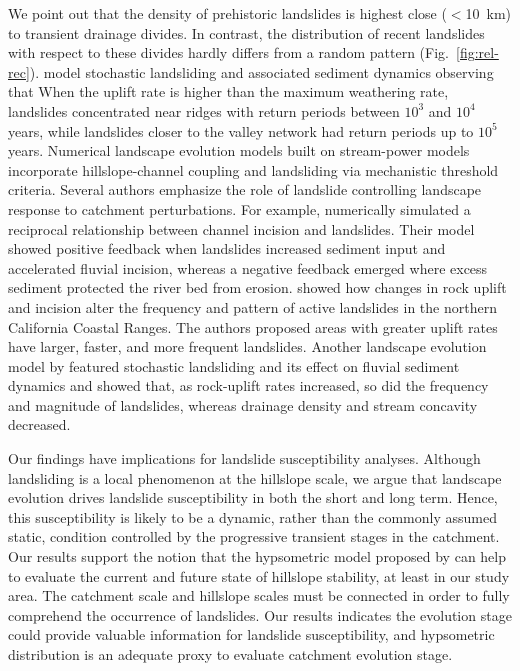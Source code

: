 \documentclass[draft]{agujournal2019}
\begin{document}
\par We point out that the density of prehistoric landslides is highest close ($<$10~km) to transient drainage divides. In contrast, the distribution of recent landslides with respect to these divides hardly differs from a random pattern (Fig.~\ref{fig:rel-rec}).  model stochastic landsliding and associated sediment dynamics observing that When the uplift rate is higher than the maximum weathering rate, landslides concentrated near ridges with return periods between $10^3$ and $10^4$ years, while landslides closer to the valley network had return periods up to $10^5$ years. Numerical landscape evolution models built on stream-power models incorporate hillslope-channel coupling and landsliding via mechanistic threshold criteria. Several authors emphasize the role of landslide controlling landscape response to catchment perturbations. For example,  numerically simulated a reciprocal relationship between channel incision and landslides. Their model showed positive feedback when landslides increased sediment input and accelerated fluvial incision, whereas a negative feedback emerged where excess sediment protected the river bed from erosion.  showed how changes in rock uplift and incision alter the frequency and pattern of active landslides in the northern California Coastal Ranges. The authors proposed areas with greater uplift rates have larger, faster, and more frequent landslides. Another landscape evolution model by  featured stochastic landsliding and its effect on fluvial sediment dynamics and showed that, as rock-uplift rates increased, so did the frequency and magnitude of landslides, whereas drainage density and stream concavity decreased.

\par Our findings have implications for landslide susceptibility analyses. Although landsliding is a local phenomenon at the hillslope scale, we argue that landscape evolution drives landslide susceptibility in both the short and long term. Hence, this susceptibility is likely to be a dynamic, rather than the commonly assumed static, condition controlled by the progressive transient stages in the catchment. Our results support the notion that the hypsometric model proposed by  can help to evaluate the current and future state of hillslope stability, at least in our study area.  The catchment scale and hillslope scales must be connected in order to fully comprehend the occurrence of landslides. Our results indicates the evolution stage could provide valuable information for landslide susceptibility, and hypsometric distribution is an adequate proxy to evaluate catchment evolution stage. 
\end{document}
